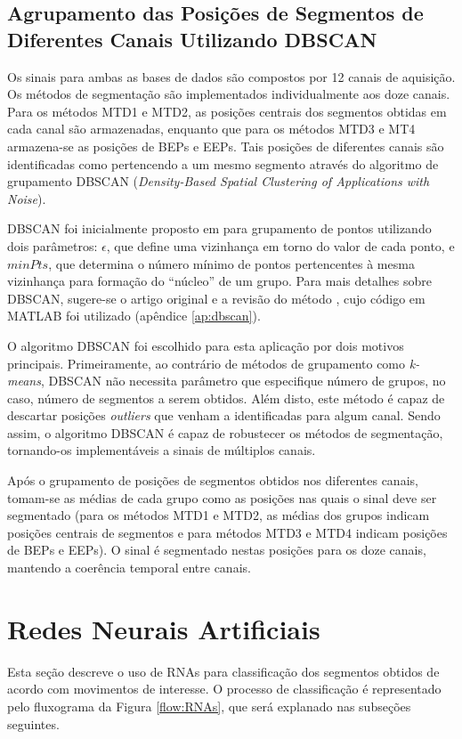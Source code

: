 			\subsection{Agrupamento das Posições de Segmentos de Diferentes Canais Utilizando DBSCAN}
Os sinais para ambas as bases de dados são compostos por 12 canais de aquisição. Os métodos de segmentação são implementados individualmente aos doze canais. Para os métodos MTD1 e MTD2, as posições centrais dos segmentos obtidas em cada canal são armazenadas, enquanto que para os métodos MTD3 e MT4 armazena-se as posições de BEPs e EEPs. Tais posições de diferentes canais são identificadas como pertencendo a um mesmo segmento através do algoritmo de grupamento DBSCAN (\emph{Density-Based Spatial Clustering of Applications with Noise}).

DBSCAN foi inicialmente proposto em \cite{Ester1996} para grupamento de pontos utilizando dois parâmetros: $\epsilon$, que define uma vizinhança em torno do valor de cada ponto, e $minPts$, que determina o número mínimo de pontos pertencentes à mesma vizinhança para formação do ``núcleo'' de um grupo. Para mais detalhes sobre DBSCAN, sugere-se o artigo original \cite{Ester1996} e a revisão do método \cite{Thanh2013}, cujo código em MATLAB foi utilizado (apêndice \ref{ap:dbscan}).

O algoritmo DBSCAN foi escolhido para esta aplicação por dois motivos principais. Primeiramente, ao contrário de métodos de grupamento como \emph{k-means}, DBSCAN não necessita parâmetro que especifique número de grupos, no caso, número de segmentos a serem obtidos. Além disto, este método é capaz de descartar posições \emph{outliers} que venham a identificadas para algum canal. Sendo assim, o algoritmo DBSCAN é capaz de robustecer os métodos de segmentação, tornando-os implementáveis a sinais de múltiplos canais.

Após o grupamento de posições de segmentos obtidos nos diferentes canais, tomam-se as médias de cada grupo como as posições nas quais o sinal deve ser segmentado (para os métodos MTD1 e MTD2, as médias dos grupos indicam posições centrais de segmentos e para métodos MTD3 e MTD4 indicam posições de BEPs e EEPs). O sinal é segmentado nestas posições para os doze canais, mantendo a coerência temporal entre canais.

		\section{Redes Neurais Artificiais}
Esta seção descreve o uso de RNAs para classificação dos segmentos obtidos de acordo com movimentos de interesse. O processo de classificação é representado pelo fluxograma da Figura \ref{flow:RNAs}, que será explanado nas subseções seguintes.

